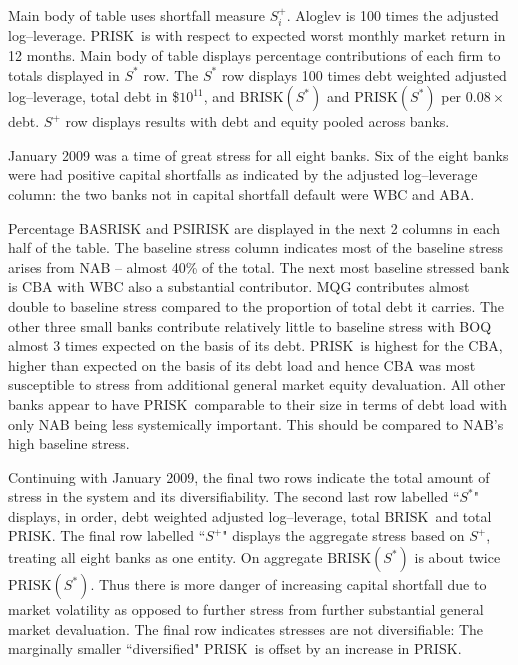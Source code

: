 \documentclass[authoryear]{elsarticle}
\newcommand{\br}{\ensuremath{\mathrm{BRISK}}}
\newcommand{\pr}{\ensuremath{\mathrm{PRISK}}}
\begin{document}
\begin{table}[ht]
\begin{threeparttable}
\begin{tabular}{l|rrrr|rrrr}
\end{tabular}
\begin{tablenotes}
\item[]Main body of table uses shortfall measure  $S_i^+$. Aloglev is 100 times the adjusted log--leverage. \pr\  is with respect to expected worst monthly market return  in 12 months.  Main body of table displays percentage contributions of each firm to totals displayed in $S^*$ row.   The $S^*$ row displays 100 times debt weighted adjusted log--leverage, total debt in \$$10^{11}$, and $\br(S^*)$  and $\pr(S^*)$ per $0.08\times$debt.  $S^+$ row displays results with debt and equity pooled across banks. 
\end{tablenotes}
\end{threeparttable}
\end{table}
\normalsize


January 2009 was a time of great stress for all eight banks.       Six of the eight banks were had positive capital shortfalls as indicated by the adjusted log--leverage column:   the two banks not in capital shortfall default were WBC and ABA.    
 
 Percentage BASRISK and PSIRISK are displayed in the next 2 columns in each half of the table.    The baseline stress column indicates most of the baseline stress arises from NAB -- almost 40\% of the total.   The next most baseline stressed bank is CBA with WBC also a substantial contributor.   MQG contributes almost double to baseline stress compared to the proportion of total debt  it carries.  The other three small banks contribute relatively little to baseline stress with BOQ  almost 3 times expected on the basis of its debt.   \pr\   is highest for the CBA, higher than expected on the basis of its debt load and hence CBA was most susceptible to stress from additional general market equity devaluation.    All other banks appear to have \pr\ comparable to their size in terms of debt load with only NAB being less systemically important.    This should be compared to NAB's high baseline stress.

Continuing with January 2009, the final two rows indicate the total amount of stress in the system and its diversifiability.    
The second last  row labelled ``$S^*$"  displays, in order, debt weighted adjusted log--leverage, total \br\  and total \pr.   The final row labelled ``$S^+$" displays the aggregate stress based on $S^+$, treating all eight banks as one entity.  
On aggregate \br$(S^*)$  is about twice \pr$(S^*)$.   Thus there is more danger of increasing capital shortfall due to market volatility  as opposed to further stress from further substantial general market devaluation.  The final row indicates stresses are not diversifiable:    The marginally  smaller  ``diversified"  \pr\ is offset by an increase in \pr.   
\end{document}

